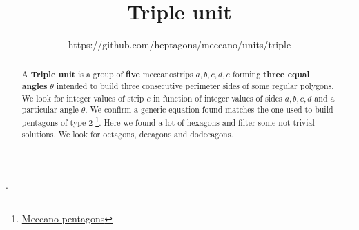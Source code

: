 \documentclass[11pt]{article}
\title{\textbf{Triple unit}}
\author{https://github.com/heptagons/meccano/units/triple}
\date{}
\begin{document}
\maketitle
\begin{abstract}
A \textbf{Triple unit} is a group of \textbf{five} meccano\meccanoref strips $a,b,c,d,e$
forming \textbf{three equal angles} $\theta$ intended to build three consecutive perimeter sides
of some regular polygons.
We look for integer values of strip $e$ in function of integer values of sides $a,b,c,d$ and 
a particular angle $\theta$.
We confirm a generic equation found matches the one used to build pentagons of type 2 \footnote{
\href{https://github.com/heptagons/meccano/blob/main/penta/pentagons.pdf}{Meccano pentagons}}.
Here we found a lot of hexagons and filter some not trivial solutions.
We look for octagons, decagons and dodecagons.
\end{abstract}.
\end{document}
